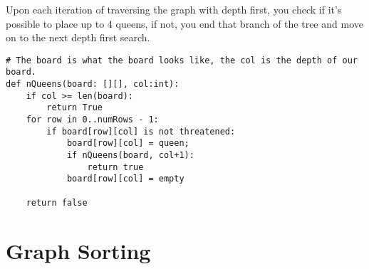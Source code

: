 \documentclass{article}
\begin{document}
Upon each iteration of traversing the graph with depth first, you check if it's possible to place up to 4 queens, if not, you end that branch of the tree and move on to the next depth first search.

\begin{verbatim}
# The board is what the board looks like, the col is the depth of our board.
def nQueens(board: [][], col:int):
    if col >= len(board):
        return True
    for row in 0..numRows - 1:
        if board[row][col] is not threatened:
            board[row][col] = queen;
            if nQueens(board, col+1):
                return true
            board[row][col] = empty

    return false
\end{verbatim}

\section{Graph Sorting}
\label{sec:org8507637}
\end{document}

